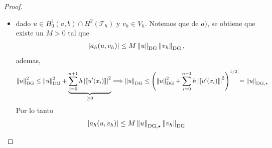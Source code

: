 \documentclass[10pt,a4paper]{report}
\newcommand{\DG}{\textup{DG}}
\providecommand{\abs}[1]{\left\lvert#1\right\rvert}
\providecommand{\norm}[1]{\left\lVert#1\right\rVert}
\providecommand{\salto}[1]{\left\llbracket#1\right\rrbracket}
\begin{document}
\begin{proof}
\begin{itemize}
\begin{align*}
            	&\leq M\norm{u}_{\DG}\norm{v}_{\DG}
            \end{align*}
            donde $M := 2L$ y $L = \max\{1,C,N,C^{u}_{\textup{tr}},C^{v}_{\textup{tr}},S^{u}_{\textup{tr}},S^{v}_{\textup{tr}},\alpha\}$.
    	    \item[$(b)$] dado $u\in H_{0}^{1}(a,b)\cap H^{2}(\mathcal{T}_{h})$ y $v_{h}\in V_{h}$. Notemos que de $a)$, se obtiene que existe un $M>0$ tal que 
    	    \begin{align*}
    	    	\abs{a_{h}(u,v_{h})}\leq M\norm{u}_{\DG}\norm{v_{h}}_{\DG},
    	    \end{align*}
            ademas, 
            \begin{align*}
            	\norm{u}^{2}_{\DG} \leq \norm{u}^{2}_{\DG} + \underbrace{\sum_{i=0}^{n+1}h\abs{\salto{u'(x_{i})}}^{2}}_{\geq 0} \Longrightarrow \norm{u}_{\DG} \leq \left( \norm{u}^{2}_{\DG} + \sum_{i=0}^{n+1}h\abs{\salto{u'(x_{i})}}^{2}\right)^{1/2} = \norm{u}_{\DG,\star}
            \end{align*}
            Por lo tanto
            \begin{align*}
            	\abs{a_{h}(u,v_{h})}\leq M\norm{u}_{\DG,\star}\norm{v_{h}}_{\DG}
            \end{align*}
    	\end{itemize}
    \end{proof}
\end{document}
